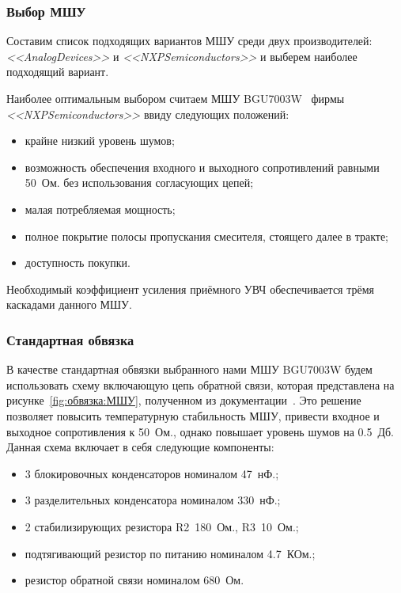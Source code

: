 \documentclass[utf8x, 14pt, oneside, a4paper]{article}
\begin{document}
			\subsubsection{Выбор МШУ}
				Составим список подходящих вариантов МШУ среди двух производителей: \textit{<<AnalogDevices>>} и \textit{<<NXPSemiconductors>>} и выберем наиболее подходящий вариант.
			
				
			
				Наиболее оптимальным выбором считаем МШУ BGU7003W~\cite{bib:УПЧ} фирмы \textit{<<NXPSemiconductors>>} ввиду следующих положений:
				\begin{itemize}
					\item крайне низкий уровень шумов;
					\item возможность обеспечения входного и выходного сопротивлений равными 50~Ом. без использования согласующих цепей;
					\item малая потребляемая мощность;
					\item полное покрытие полосы пропускания смесителя, стоящего далее в тракте;
					\item доступность покупки.
				\end{itemize}
				Необходимый коэффициент усиления приёмного УВЧ обеспечивается трёмя каскадами данного МШУ.
			
			\subsubsection{Стандартная обвязка}
				В качестве стандартная обвязки выбранного нами МШУ BGU7003W будем использовать схему включающую цепь обратной связи, которая представлена на рисунке~\ref{fig:обвязка:МШУ}, полученном из документации~\cite{bib:МШУ}. Это решение позволяет повысить температурную стабильность МШУ, привести входное и выходное сопротивления к 50~Ом., однако повышает уровень шумов на 0.5~Дб. Данная схема включает в себя следующие компоненты:
				\begin{itemize}
					\item 3 блокировочных конденсаторов номиналом 47~нФ.;
					\item 3 разделительных конденсатора номиналом 330~нФ.;
					\item 2 стабилизирующих резистора R2~180~Ом., R3~10~Ом.;
					\item подтягивающий резистор по питанию номиналом 4.7~КОм.;
					\item резистор обратной связи номиналом 680~Ом.
				\end{itemize}
			
\end{document}
